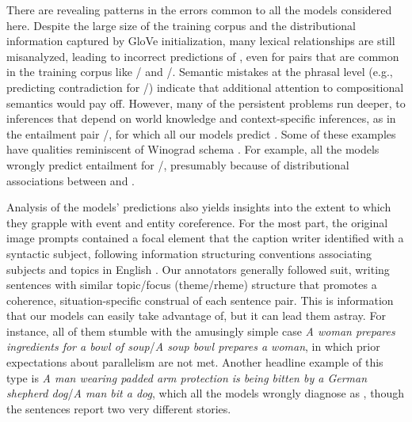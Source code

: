 There are revealing patterns in the errors common to all the models
considered here. Despite the large size of the training corpus and the
distributional information captured by GloVe initialization, many
lexical relationships are still misanalyzed, leading to incorrect
predictions of , even for pairs that are common in the
training corpus like / and
/. Semantic mistakes at the phrasal level
(e.g., predicting contradiction for /) indicate
that additional attention to compositional semantics would pay off.
%
%
However, many of the persistent problems run deeper, to inferences
that depend on world knowledge and context-specific inferences, as in
the entailment pair /, for which all our
models predict . Some of these examples have qualities
reminiscent of Winograd schema \cite{Winograd:1972,Levesque:2013}. For
example, all the models wrongly predict
entailment for /, presumably because of
distributional associations between  and .

Analysis of the models' predictions also yields insights into the
extent to which they grapple with event and entity coreference. For
the most part, the original image prompts contained a focal element
that the caption writer identified with a syntactic subject, following
information structuring conventions associating subjects and topics in
English \cite{Ward04}. Our annotators generally followed suit, writing
sentences with similar topic/focus (theme/rheme) structure that
promotes a coherence, situation-specific construal of each sentence
pair. This is information that our models can easily take advantage
of, but it can lead them astray. For instance, all of them stumble
with the amusingly simple case \emph{A woman prepares ingredients for
  a bowl of soup}/\emph{A soup bowl prepares a woman}, in which prior
expectations about parallelism are not met. Another headline example
of this type is \emph{A man wearing padded arm protection is being
  bitten by a German shepherd dog}/\emph{A man bit a dog}, which all
the models wrongly diagnose as , though the sentences
report two very different stories.


